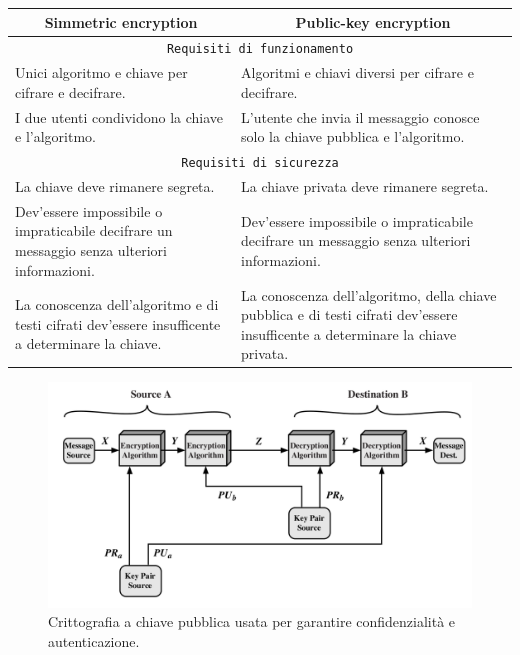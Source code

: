 \documentclass[a4paper, 11pt, notitlepage, fleqn]{report}
\begin{document}
\begin{table}[htp]
	\renewcommand{\arraystretch}{1.3}
	\begin{tabularx}{\linewidth}{X|X}
		\toprule
		\multicolumn{1}{c|}{\textbf{Simmetric encryption}} & \multicolumn{1}{c}{\textbf{Public-key encryption}}\\
		\toprule
		\multicolumn{2}{c}{\texttt{Requisiti di funzionamento}}\\
		Unici algoritmo e chiave per cifrare e decifrare. & Algoritmi e chiavi diversi per cifrare e decifrare.\\
		I due utenti condividono la chiave e l'algoritmo. & L'utente che invia il messaggio conosce solo la chiave pubblica e l'algoritmo.\\
		\multicolumn{2}{c}{\texttt{Requisiti di sicurezza}}\\
		La chiave deve rimanere segreta. & La chiave privata deve rimanere segreta.\\
		Dev'essere impossibile o impraticabile decifrare un messaggio senza ulteriori informazioni. & Dev'essere impossibile o impraticabile decifrare un messaggio senza ulteriori informazioni.\\
		La conoscenza dell'algoritmo e di testi cifrati dev'essere insufficente a determinare la chiave. & La conoscenza dell'algoritmo, della chiave pubblica e di testi cifrati dev'essere insufficente a determinare la chiave privata.\\
		\bottomrule
	\end{tabularx}
\end{table}

\begin{figure}[htp]
	\centering
	\includegraphics[width=\textwidth]{images/PublicKey}
	\captionsetup{format=hang,width=.8\textwidth}
	\caption{Crittografia a chiave pubblica usata per garantire confidenzialità e autenticazione.}
\end{figure}
\end{document}

